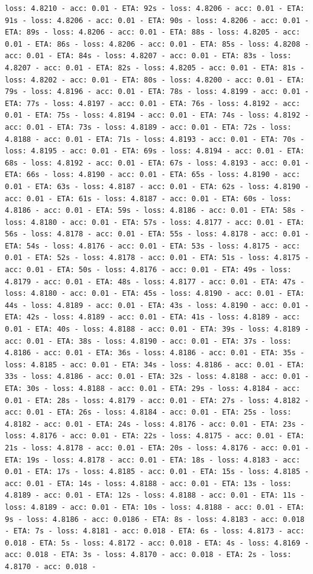 \documentclass[11pt]{article}
\begin{document}
\begin{Verbatim}[commandchars=\\\{\}]
loss: 4.8210 - acc: 0.01 - ETA: 92s - loss: 4.8206 - acc: 0.01 - ETA: 91s - loss: 4.8206 - acc: 0.01 - ETA: 90s - loss: 4.8206 - acc: 0.01 - ETA: 89s - loss: 4.8206 - acc: 0.01 - ETA: 88s - loss: 4.8205 - acc: 0.01 - ETA: 86s - loss: 4.8206 - acc: 0.01 - ETA: 85s - loss: 4.8208 - acc: 0.01 - ETA: 84s - loss: 4.8207 - acc: 0.01 - ETA: 83s - loss: 4.8207 - acc: 0.01 - ETA: 82s - loss: 4.8205 - acc: 0.01 - ETA: 81s - loss: 4.8202 - acc: 0.01 - ETA: 80s - loss: 4.8200 - acc: 0.01 - ETA: 79s - loss: 4.8196 - acc: 0.01 - ETA: 78s - loss: 4.8199 - acc: 0.01 - ETA: 77s - loss: 4.8197 - acc: 0.01 - ETA: 76s - loss: 4.8192 - acc: 0.01 - ETA: 75s - loss: 4.8194 - acc: 0.01 - ETA: 74s - loss: 4.8192 - acc: 0.01 - ETA: 73s - loss: 4.8189 - acc: 0.01 - ETA: 72s - loss: 4.8188 - acc: 0.01 - ETA: 71s - loss: 4.8193 - acc: 0.01 - ETA: 70s - loss: 4.8195 - acc: 0.01 - ETA: 69s - loss: 4.8194 - acc: 0.01 - ETA: 68s - loss: 4.8192 - acc: 0.01 - ETA: 67s - loss: 4.8193 - acc: 0.01 - ETA: 66s - loss: 4.8190 - acc: 0.01 - ETA: 65s - loss: 4.8190 - acc: 0.01 - ETA: 63s - loss: 4.8187 - acc: 0.01 - ETA: 62s - loss: 4.8190 - acc: 0.01 - ETA: 61s - loss: 4.8187 - acc: 0.01 - ETA: 60s - loss: 4.8186 - acc: 0.01 - ETA: 59s - loss: 4.8186 - acc: 0.01 - ETA: 58s - loss: 4.8180 - acc: 0.01 - ETA: 57s - loss: 4.8177 - acc: 0.01 - ETA: 56s - loss: 4.8178 - acc: 0.01 - ETA: 55s - loss: 4.8178 - acc: 0.01 - ETA: 54s - loss: 4.8176 - acc: 0.01 - ETA: 53s - loss: 4.8175 - acc: 0.01 - ETA: 52s - loss: 4.8178 - acc: 0.01 - ETA: 51s - loss: 4.8175 - acc: 0.01 - ETA: 50s - loss: 4.8176 - acc: 0.01 - ETA: 49s - loss: 4.8179 - acc: 0.01 - ETA: 48s - loss: 4.8177 - acc: 0.01 - ETA: 47s - loss: 4.8180 - acc: 0.01 - ETA: 45s - loss: 4.8190 - acc: 0.01 - ETA: 44s - loss: 4.8189 - acc: 0.01 - ETA: 43s - loss: 4.8190 - acc: 0.01 - ETA: 42s - loss: 4.8189 - acc: 0.01 - ETA: 41s - loss: 4.8189 - acc: 0.01 - ETA: 40s - loss: 4.8188 - acc: 0.01 - ETA: 39s - loss: 4.8189 - acc: 0.01 - ETA: 38s - loss: 4.8190 - acc: 0.01 - ETA: 37s - loss: 4.8186 - acc: 0.01 - ETA: 36s - loss: 4.8186 - acc: 0.01 - ETA: 35s - loss: 4.8185 - acc: 0.01 - ETA: 34s - loss: 4.8186 - acc: 0.01 - ETA: 33s - loss: 4.8186 - acc: 0.01 - ETA: 32s - loss: 4.8188 - acc: 0.01 - ETA: 30s - loss: 4.8188 - acc: 0.01 - ETA: 29s - loss: 4.8184 - acc: 0.01 - ETA: 28s - loss: 4.8179 - acc: 0.01 - ETA: 27s - loss: 4.8182 - acc: 0.01 - ETA: 26s - loss: 4.8184 - acc: 0.01 - ETA: 25s - loss: 4.8182 - acc: 0.01 - ETA: 24s - loss: 4.8176 - acc: 0.01 - ETA: 23s - loss: 4.8176 - acc: 0.01 - ETA: 22s - loss: 4.8175 - acc: 0.01 - ETA: 21s - loss: 4.8178 - acc: 0.01 - ETA: 20s - loss: 4.8176 - acc: 0.01 - ETA: 19s - loss: 4.8178 - acc: 0.01 - ETA: 18s - loss: 4.8183 - acc: 0.01 - ETA: 17s - loss: 4.8185 - acc: 0.01 - ETA: 15s - loss: 4.8185 - acc: 0.01 - ETA: 14s - loss: 4.8188 - acc: 0.01 - ETA: 13s - loss: 4.8189 - acc: 0.01 - ETA: 12s - loss: 4.8188 - acc: 0.01 - ETA: 11s - loss: 4.8189 - acc: 0.01 - ETA: 10s - loss: 4.8188 - acc: 0.01 - ETA: 9s - loss: 4.8186 - acc: 0.0186 - ETA: 8s - loss: 4.8183 - acc: 0.018 - ETA: 7s - loss: 4.8181 - acc: 0.018 - ETA: 6s - loss: 4.8173 - acc: 0.018 - ETA: 5s - loss: 4.8172 - acc: 0.018 - ETA: 4s - loss: 4.8169 - acc: 0.018 - ETA: 3s - loss: 4.8170 - acc: 0.018 - ETA: 2s - loss: 4.8170 - acc: 0.018 - 
\end{Verbatim}
\end{document}
